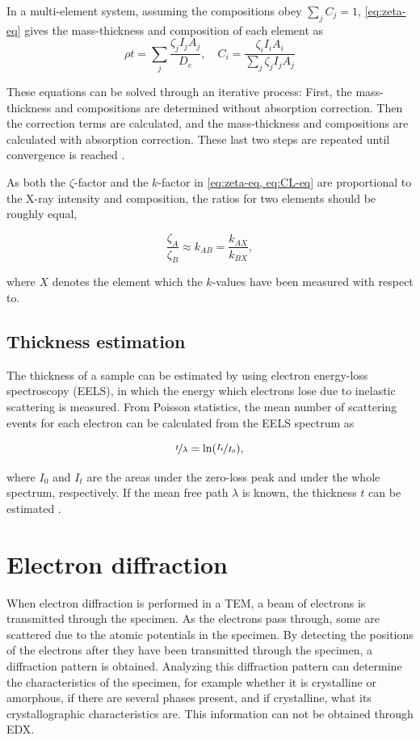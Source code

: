 In a multi-element system, assuming the compositions obey $\sum_{j} C_j = 1$, \cref{eq:zeta-eq} gives the mass-thickness and composition of each element as
\begin{equation}
\rho t = \sum_j \frac{\zeta_j I_j A_j}{D_e}, \quad C_i = \frac{\zeta_i I_i A_i}{\sum_j \zeta_j I_j A_j}
\end{equation}

These equations can be solved through an iterative process: First, the mass-thickness and compositions are determined without absorption correction. Then the correction terms are calculated, and the mass-thickness and compositions are calculated with absorption correction. These last two steps are repeated until convergence is reached \cite{zeta-method}.

As both the $\zeta$-factor and the $k$-factor in \cref{eq:zeta-eq, eq:CL-eq} are proportional to the X-ray intensity and composition, the ratios for two elements should be roughly equal,

\begin{equation}
\label{compare_zeta_CL}
\frac{\zeta_A}{\zeta_B} \approx k_{AB} = \frac{k_{AX}}{k_{BX}},
\end{equation}

where $X$ denotes the element which the $k$-values have been measured with respect to.

	\subsection{Thickness estimation}
	\label{sec:theory/thickness-est}
The thickness of a sample can be estimated by using electron energy-loss spectroscopy (EELS), in which the energy which electrons lose due to inelastic scattering is measured. From Poisson statistics, the mean number of scattering events for each electron can be calculated from the EELS spectrum as 

\begin{equation}
\label{eq:logratio}
\nicefrac{t}{\lambda}=\ln (\nicefrac{I_t}{I_0}),
\end{equation}

where $I_0$ and $I_t$ are the areas under the zero-loss peak and under the whole spectrum, respectively. If the mean free path $\lambda$ is known, the thickness $t$ can be estimated \cite{eels-bok,logratio-article}.

\section{Electron diffraction}\label{ED}
When electron diffraction is performed in a TEM, a beam of electrons is transmitted through the specimen. As the electrons pass through, some are scattered due to the atomic potentials in the specimen. By detecting the positions of the electrons after they have been transmitted through the specimen, a diffraction pattern is obtained. Analyzing this diffraction pattern can determine the characteristics of the specimen, for example whether it is crystalline or amorphous, if there are several phases present, and if crystalline, what its crystallographic characteristics are. This information can not be obtained through EDX.

